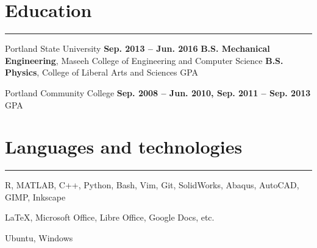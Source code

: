 \section{Education}
	\noindent\rule{\textwidth}{\hlinewidth}
	\begin{innerlist}
	\item Portland State University		\hfill\textbf{Sep. 2013 -- Jun. 2016}
		\subitem \textbf{B.S. Mechanical Engineering}, Maseeh College of Engineering and Computer Science 
		\subitem\textbf{B.S. Physics}, College of Liberal Arts and Sciences
		 GPA
	\\
	\item Portland Community College  \hfill\textbf{Sep. 2008 -- Jun. 2010, Sep. 2011 -- Sep. 2013}
		 GPA
	\end{innerlist}
\vfill
\section{Languages and technologies}

\noindent\rule{\textwidth}{\hlinewidth}
    \begin{innerlist}
        \item R, MATLAB, C++, Python, Bash, Vim, Git, SolidWorks, Abaqus, AutoCAD, GIMP, Inkscape
        \item \LaTeX, Microsoft Office, Libre Office, Google Docs, etc.
	\item Ubuntu, Windows
    \end{innerlist}
\vfill
